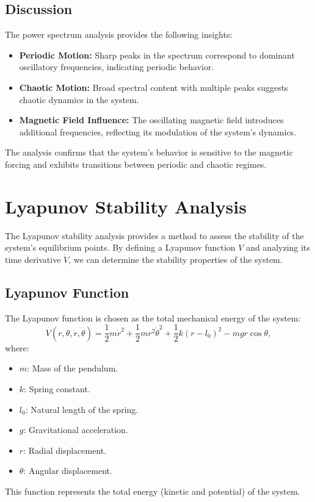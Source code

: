 \documentclass[12pt]{article}
\begin{document}
\subsection{Discussion}
The power spectrum analysis provides the following insights:
\begin{itemize}
    \item \textbf{Periodic Motion:} Sharp peaks in the spectrum correspond to dominant oscillatory frequencies, indicating periodic behavior.
    \item \textbf{Chaotic Motion:} Broad spectral content with multiple peaks suggests chaotic dynamics in the system.
    \item \textbf{Magnetic Field Influence:} The oscillating magnetic field introduces additional frequencies, reflecting its modulation of the system's dynamics.
\end{itemize}
The analysis confirms that the system's behavior is sensitive to the magnetic forcing and exhibits transitions between periodic and chaotic regimes.

\section{Lyapunov Stability Analysis}

The Lyapunov stability analysis provides a method to assess the stability of the system's equilibrium points. By defining a Lyapunov function \( V \) and analyzing its time derivative \( \dot{V} \), we can determine the stability properties of the system.

\subsection{Lyapunov Function}
The Lyapunov function is chosen as the total mechanical energy of the system:
\[
V(r, \theta, \dot{r}, \dot{\theta}) = \frac{1}{2} m \dot{r}^2 + \frac{1}{2} m r^2 \dot{\theta}^2 + \frac{1}{2} k (r - l_0)^2 - m g r \cos\theta,
\]
where:
\begin{itemize}
    \item \( m \): Mass of the pendulum.
    \item \( k \): Spring constant.
    \item \( l_0 \): Natural length of the spring.
    \item \( g \): Gravitational acceleration.
    \item \( r \): Radial displacement.
    \item \( \theta \): Angular displacement.
\end{itemize}
This function represents the total energy (kinetic and potential) of the system.
\end{document}
